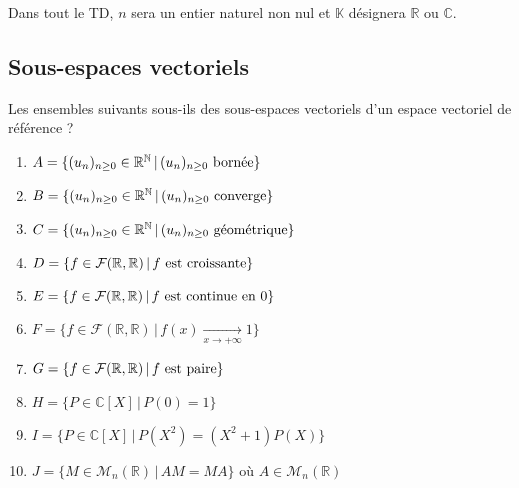 \documentclass[a4paper,twoside,french,10pt]{VcCours}
\begin{document}

\tableofcontents
\separationTitre


Dans tout le TD, $n$ sera un entier naturel non nul et $\mathbb{K}$ désignera $\mathbb{R}$ ou $\mathbb{C}$.

\medskip

\subsection{\large Sous-espaces vectoriels}

\begin{Exercice}{} Les ensembles suivants sous-ils des sous-espaces vectoriels d'un espace vectoriel de référence ?

\begin{multicols}{2}
\begin{small}
\begin{enumerate}
\item $A = \lbrace (u_n)_{n \geq 0} \in \mathbb{R}^{\mathbb{N}} \, \vert \, (u_n)_{n \geq 0} \hbox{ bornée} \rbrace $
\item $B = \lbrace (u_n)_{n \geq 0} \in \mathbb{R}^{\mathbb{N}} \, \vert \, (u_n)_{n \geq 0} \hbox{ converge} \rbrace $
\item $C = \lbrace (u_n)_{n \geq 0} \in \mathbb{R}^{\mathbb{N}} \, \vert \, (u_n)_{n \geq 0} \hbox{ géométrique} \rbrace $
\item $D = \lbrace f \in \mathcal{F}(\mathbb{R}, \mathbb{R}) \, \vert \, f \hbox{ est croissante} \rbrace$
\item $E = \lbrace f \in \mathcal{F}(\mathbb{R}, \mathbb{R}) \, \vert \, f \hbox{ est continue en 0} \rbrace$
\columnbreak
\item $F = \lbrace f \in \mathcal{F}(\mathbb{R}, \mathbb{R}) \, \vert \, f(x) \underset{ x \rightarrow + \infty}{\rightarrow} 1 \rbrace$
\item $G= \lbrace f \in \mathcal{F}(\mathbb{R}, \mathbb{R}) \, \vert \, f \hbox{ est paire} \rbrace$
\item $H= \lbrace P \in \mathbb{C}[X] \, \vert \, P(0)=1  \rbrace$
\item $I= \lbrace P \in \mathbb{C}[X] \, \vert \, P(X^2)=(X^2+1)P(X)  \rbrace$
\item $J= \lbrace M \in \mathcal{M}_n(\mathbb{R}) \, \vert \, AM=MA \rbrace$ où $A \in \mathcal{M}_n(\mathbb{R})$
\end{enumerate}
\end{small}
\end{multicols}
\vspace{0.01cm}
\end{Exercice}
\end{document}
